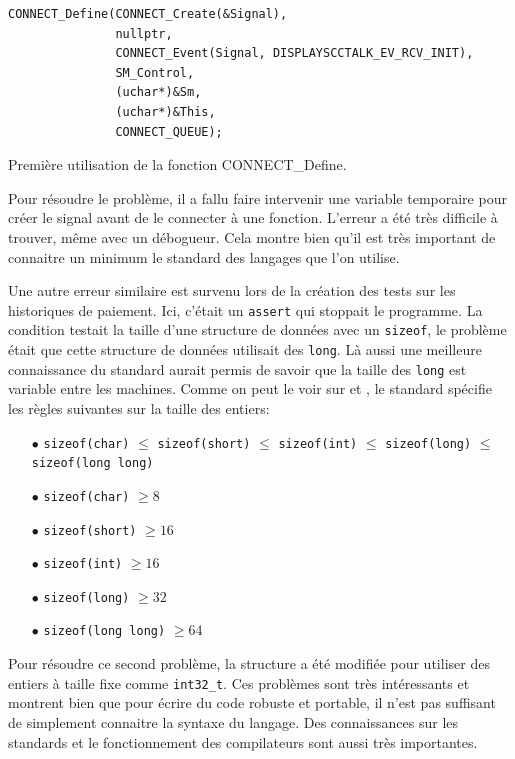 \documentclass[a4paper]{article}
\begin{document}
\pagebreak
\begin{listing}[ht!]
\begin{verbatim}
CONNECT_Define(CONNECT_Create(&Signal),
               nullptr,
               CONNECT_Event(Signal, DISPLAYSCCTALK_EV_RCV_INIT),
               SM_Control,
               (uchar*)&Sm,
               (uchar*)&This,
               CONNECT_QUEUE);
\end{verbatim}
\caption{Première utilisation de la fonction CONNECT\_Define.}
\label{firstconnectdefine}
\end{listing}

Pour résoudre le problème, il a fallu faire intervenir une variable temporaire
pour créer le signal avant de le connecter à une fonction. L'erreur a été très
difficile à trouver, même avec un débogueur. Cela montre bien qu'il est très
important de connaitre un minimum le standard des langages que l'on utilise.

Une autre erreur similaire est survenu lors de la création des tests sur les
historiques de paiement. Ici, c'était un \verb|assert| qui stoppait le
programme. La condition testait la taille d'une structure de données avec un
\verb|sizeof|, le problème était que cette structure de données utilisait des
\verb|long|. Là aussi une meilleure connaissance du standard aurait permis de
savoir que la taille des \verb|long| est variable entre les machines. Comme on
peut le voir sur \cite{ISO:C99} et \cite{typescppref}, le standard spécifie les
règles suivantes sur la taille des entiers:

\begin{itemize}
  \item[$\bullet$] \verb|sizeof(char)| $\leq$ \verb|sizeof(short)| $\leq$ \verb|sizeof(int)| $\leq$ \verb|sizeof(long)| $\leq$ \verb|sizeof(long long)|
  \item[$\bullet$] \verb|sizeof(char)| $\geq 8$
  \item[$\bullet$] \verb|sizeof(short)| $\geq 16$
  \item[$\bullet$] \verb|sizeof(int)| $\geq 16$
  \item[$\bullet$] \verb|sizeof(long)| $\geq 32$
  \item[$\bullet$] \verb|sizeof(long long)| $\geq 64$
\end{itemize}

Pour résoudre ce second problème, la structure a été modifiée pour utiliser des
entiers à taille fixe comme \verb|int32_t|. Ces problèmes sont très intéressants
et montrent bien que pour écrire du code robuste et portable, il n'est pas
suffisant de simplement connaitre la syntaxe du langage. Des connaissances sur
les standards et le fonctionnement des compilateurs sont aussi très
importantes.\\
\end{document}
